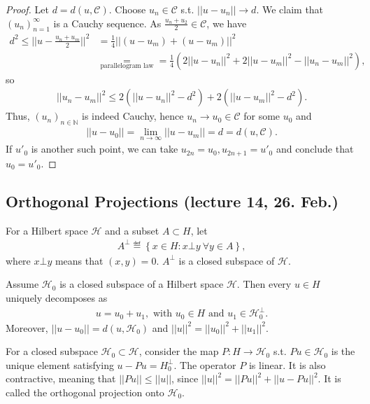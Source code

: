 \ifdetailed 
\begin{proof}
    Let \(d=d(u,\mathcal{C})\). Choose \(u_n\in\mathcal{C}\) s.t. \(||u-u_n||\rightarrow d\). We claim that \((u_n)^{\infty}_{n=1}\) is a 
    Cauchy sequence. As \(\frac{u_n+u_2}{2}\in\mathcal{C}\), we have 
    \begin{align*}
        d^2\leq ||u-\frac{u_n+u_m}{2}||^2 &= \frac{1}{4}||(u-u_m)+(u-u_m)||^2 \\
        &\underset{\text{parallelogram law}}{=} = \frac{1}{4}\left(2||u-u_n||^2 + 2||u-u_m||^2 - ||u_n-u_m||^2\right),
    \end{align*}
    so 
    \begin{align*}
        ||u_n-u_m||^2 \leq 2\left( ||u-u_n||^2 - d^2 \right) + 2\left( ||u-u_m||^2 - d^2 \right).
    \end{align*}
    Thus, \((u_n)_{n\in\mathbb{N}}\) is indeed Cauchy, hence \(u_n\rightarrow u_0\in\mathcal{C}\) for some \(u_0\) and
    \begin{align*}
        ||u-u_0|| = \lim\limits_{n\rightarrow\infty} ||u-u_m|| = d = d(u,\mathcal{C}).
    \end{align*}
    If \(u'_0\) is another such point, we can take \(u_{2n}=u_0, u_{2n+1}=u'_0\) and conclude that \(u_0 = u'_0\).
\end{proof}
\fi 
\subsection*{Orthogonal Projections (lecture 14, 26. Feb.)}
For a Hilbert space \(\mathcal{H}\) and a subset \(A\subset H\), let
\begin{align*}
    A^{\bot} \eqdef \left\{x\in H: x\bot y\ \forall y \in A\right\},
\end{align*}
where \(x\bot y\) means that \((x,y) = 0\). \(A^{\bot}\) is a closed subspace of \(\mathcal{H}\).
\begin{proposition}
    Assume \(\mathcal{H}_0\) is a closed subspace of a Hilbert space \(\mathcal{H}\). Then every \(u\in H\) uniquely decomposes as
    \begin{align*}
        u = u_0 + u_1, \text{ with } u_0\in H \text{ and } u_1 \in \mathcal{H}_{0}^{\bot}.
    \end{align*}
    Moreover, \(||u - u_0||= d(u,\mathcal{H}_0)\) and \(||u||^2 = ||u_0||^2 + ||u_1||^2\).
\end{proposition}

For a closed subspace \(\mathcal{H}_0\subset \mathcal{H}\), consider the map \(P:H\rightarrow \mathcal{H}_0\) s.t.
\(Pu\in \mathcal{H}_0\) is the unique element satisfying \(u-Pu = H_{0}^{\bot}\). The operator \(P\) is linear. It is also contractive, meaning that
\(||Pu||\leq ||u||\), since \(||u||^2 = ||Pu||^2 + ||u-Pu||^2\). It is called the orthogonal projection onto \(\mathcal{H}_0\).

